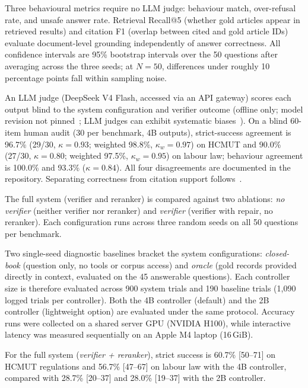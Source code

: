 Three behavioural metrics require no LLM judge: behaviour match, over-refusal rate, and unsafe answer rate. Retrieval Recall@5 (whether gold articles appear in retrieved results) and citation F1 (overlap between cited and gold article IDs) evaluate document-level grounding independently of answer correctness. All confidence intervals are 95\% bootstrap intervals over the 50 questions after averaging across the three seeds; at $N=50$, differences under roughly 10 percentage points fall within sampling noise.

 An LLM judge (DeepSeek V4 Flash, accessed via an API gateway) scores each output blind to the system configuration and verifier outcome (offline only; model revision not pinned~\citep{deepseek2026api}; LLM judges can exhibit systematic biases~\citep{zheng2023judge}). On a blind 60-item human audit (30 per benchmark, 4B outputs), strict-success agreement is 96.7\% (29/30, $\kappa = 0.93$; weighted 98.8\%, $\kappa_w = 0.97$) on HCMUT and 90.0\% (27/30, $\kappa = 0.80$; weighted 97.5\%, $\kappa_w = 0.95$) on labour law; behaviour agreement is 100.0\% and 93.3\% ($\kappa=0.84$). All four disagreements are documented in the repository. Separating correctness from citation support follows~\citet{gao2023alce}.

 The full system (verifier and reranker) is compared against two ablations: \emph{no verifier} (neither verifier nor reranker) and \emph{verifier} (verifier with repair, no reranker). Each configuration runs across three random seeds on all 50 questions per benchmark.

Two single-seed diagnostic baselines bracket the system configurations: \emph{closed-book} (question only, no tools or corpus access) and \emph{oracle} (gold records provided directly in context, evaluated on the 45 answerable questions). Each controller size is therefore evaluated across 900 system trials and 190 baseline trials (1{,}090 logged trials per controller). Both the 4B controller (default) and the 2B controller (lightweight option) are evaluated under the same protocol. Accuracy runs were collected on a shared server GPU (NVIDIA H100), while interactive latency was measured sequentially on an Apple M4 laptop (16\,GiB).



 For the full system (\emph{verifier + reranker}), strict success is 60.7\% [50--71] on HCMUT regulations and 56.7\% [47--67] on labour law with the 4B controller, compared with 28.7\% [20--37] and 28.0\% [19--37] with the 2B controller.


